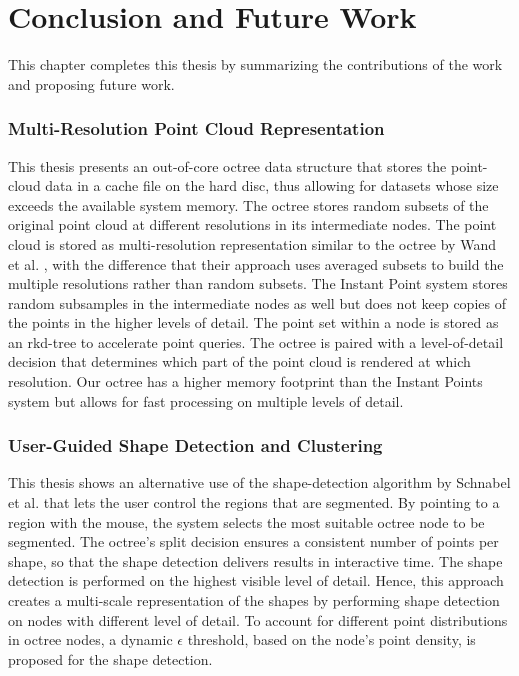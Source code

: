 \chapter{Conclusion and Future Work}
\label{chap:conclusion}


This chapter completes this thesis by summarizing the contributions of the work and proposing future work.

\subsection*{Multi-Resolution Point Cloud Representation}

This thesis presents an out-of-core octree data structure that stores the point-cloud data in a cache file on the hard disc, thus allowing for datasets whose size exceeds the available system memory. The octree stores random subsets of the original point cloud at different resolutions in its intermediate nodes. The point cloud is stored as multi-resolution representation similar to the octree by Wand et al. \cite{wand2007interactive}, with the difference that their approach uses averaged subsets to build the multiple resolutions rather than random subsets. The Instant Point system \cite{wimmer2006instant} stores random subsamples in the intermediate nodes as well but does not keep copies of the points in the higher levels of detail. The point set within a node is stored as an rkd-tree \cite{tobler2011rkd} to accelerate point queries. The octree is paired with a level-of-detail decision that determines which part of the point cloud is rendered at which resolution. Our octree has a higher memory footprint than the Instant Points system but allows for fast processing on multiple levels of detail. 


\subsection*{User-Guided Shape Detection and Clustering}

This thesis shows an alternative use of the shape-detection algorithm by Schnabel et al. \cite{schnabel-2007-efficient} that lets the user control the regions that are segmented. By pointing to a region with the mouse, the system selects the most suitable octree node to be segmented. The octree's split decision ensures a consistent number of points per shape, so that the shape detection delivers results in interactive time. The shape detection is performed on the highest visible level of detail. Hence, this approach creates a multi-scale representation of the shapes by performing shape detection on nodes with different level of detail. To account for different point distributions in octree nodes, a dynamic $\epsilon$ threshold, based on the node's point density, is proposed for the shape detection. 

